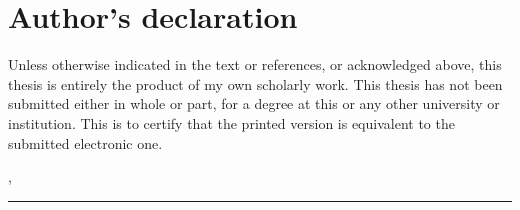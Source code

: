 \thispagestyle{empty}

\section*{Author's declaration}
\vspace*{2em}
Unless otherwise indicated in the text or references, or acknowledged above, this thesis is entirely the product of my own scholarly work. This thesis has not been submitted either in whole or part, for a degree at this or any other university or institution. This is to certify that the printed version is equivalent to the submitted electronic one.
\vspace{3em}

\abgabeort, \datumAbgabe
\vspace{4em}

\rule{6cm}{0.4pt}\\
\autor


